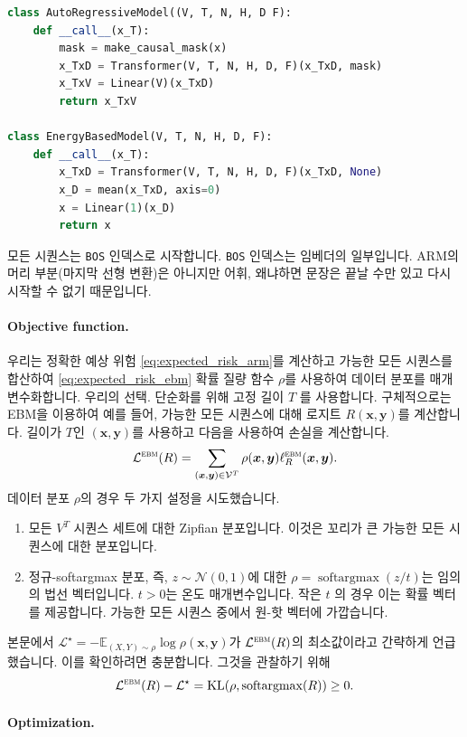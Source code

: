 \documentclass{article}
\def\x{{\bm{x}}}
\def\y{{\bm{y}}}
\def\EE{{\mathbb{E}}}
\def\cL{{\mathcal{L}}}
\def\cV{{\mathcal{V}}}
\def\ebm{{\textsc{ebm}}}
\def\softargmax{{\operatorname{softargmax}}}
\def\KL{{\mathrm{KL}}}
\def\bos{\texttt{BOS}\xspace}
\begin{document}
\begin{lstlisting}[language=Python]
class AutoRegressiveModel((V, T, N, H, D F):
    def __call__(x_T):
        mask = make_causal_mask(x)
        x_TxD = Transformer(V, T, N, H, D, F)(x_TxD, mask)
        x_TxV = Linear(V)(x_TxD)
        return x_TxV

class EnergyBasedModel(V, T, N, H, D, F):
    def __call__(x_T):
        x_TxD = Transformer(V, T, N, H, D, F)(x_TxD, None)
        x_D = mean(x_TxD, axis=0)
        x = Linear(1)(x_D)
        return x
\end{lstlisting}

모든 시퀀스는 \bos 인덱스로 시작합니다.  \bos 인덱스는 임베더의 일부입니다.
ARM의 머리 부분(마지막 선형 변환)은 아니지만 어휘,
왜냐하면 문장은 끝날 수만 있고 다시 시작할 수 없기 때문입니다.
 
\paragraph{Objective function.}

우리는 정확한 예상 위험 \eqref{eq:expected_risk_arm}를 계산하고
 가능한 모든 시퀀스를 합산하여 \eqref{eq:expected_risk_ebm}
확률 질량 함수 $\rho$를 사용하여 데이터 분포를 매개변수화합니다.
우리의 선택. 단순화를 위해 고정 길이 $T$ 를 사용합니다. 구체적으로는 EBM을 이용하여
예를 들어, 가능한 모든 시퀀스에 대해 로지트 $R(\x, \y)$를 계산합니다.
 길이가 $T$인 $(\x, \y)$를 사용하고 다음을 사용하여 손실을 계산합니다.
\[
 \cL ^{ \ebm }(R) 
= \sum _{( \x , \y ) \in \cV ^T} \rho ( \x , \y ) \ell _R^{ \ebm }( \x , \y).
\]
데이터 분포 $\rho$의 경우 두 가지 설정을 시도했습니다.
 \begin{enumerate}[nosep]
     \item 모든 $V^T$ 시퀀스 세트에 대한 Zipfian 분포입니다. 이것은
        꼬리가 큰 가능한 모든 시퀀스에 대한 분포입니다.
     \item 정규-softargmax 분포, 즉, 
     $z \sim \mathcal{N}(0, 1)$에 대한 $\rho = \softargmax(z/t)$는 임의의 법선 벡터입니다.
    $t>0$는 온도 매개변수입니다. 작은 $t$ 의 경우 이는 확률 벡터를 제공합니다. 
    가능한 모든 시퀀스 중에서 원-핫 벡터에 가깝습니다.
 \end{enumerate}

본문에서 $\cL^\star = -\EE_{(X,Y) \sim \rho}
\log \rho(\x, \y)$가 $\cL^\ebm(R)$의 최소값이라고 간략하게 언급했습니다. 이를 확인하려면 충분합니다.
그것을 관찰하기 위해
\[
 \cL ^{ \ebm }(R) - \cL ^ \star = \KL ( \rho , \softargmax (R)) \geq 0.
\]

\paragraph{Optimization.}
\end{document}
